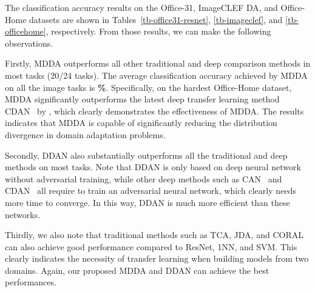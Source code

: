 \documentclass[acmsmall]{acmart}
\begin{document}
The classification accuracy results on the Office-31, ImageCLEF DA, and Office-Home datasets are shown in Tables~\ref{tb-office31-resnet}, \ref{tb-imageclef}, and \ref{tb-officehome}, respectively. From those results, we can make the following observations.

Firstly, MDDA outperforms all other traditional and deep comparison methods in most tasks (20/24 tasks). The average classification accuracy achieved by MDDA on all the image tasks is \textbf{\%}. Specifically, on the hardest Office-Home dataset, MDDA significantly outperforms the latest deep transfer learning method CDAN~\cite{long2018conditional} by , which clearly demonstrates the effectiveness of MDDA. The results indicates that MDDA is capable of significantly reducing the distribution divergence in domain adaptation problems. 

Secondly, DDAN also substantially outperforms all the traditional and deep methods on most tasks. Note that DDAN is only based on deep neural network without adversarial training, while other deep methods such as CAN~\cite{zhang2018collaborative} and CDAN~\cite{long2018conditional} all require to train an adversarial neural network, which clearly needs more time to converge. In this way, DDAN is much more efficient than these networks.

Thirdly, we also note that traditional methods such as TCA, JDA, and CORAL can also achieve good performance compared to ResNet, 1NN, and SVM. This clearly indicates the necessity of transfer learning when building models from two domains. Again, our proposed MDDA and DDAN can achieve the best performances.
\end{document}
